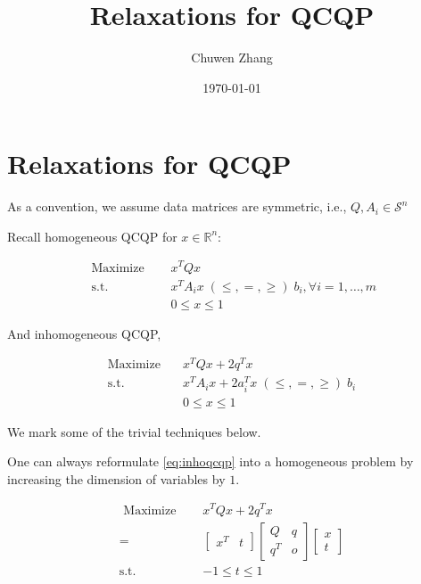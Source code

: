 \documentclass[../main]{subfiles}
\title{Relaxations for QCQP}
\author{Chuwen Zhang}
\date{\today}
\begin{document}
\maketitle
{
  \setcounter{tocdepth}{3}
  \tableofcontents
}

\section{Relaxations for QCQP}

As a convention, we assume data matrices are symmetric, i.e., \(Q, A_i \in \mathcal{S}^n\)

Recall homogeneous QCQP for \(x \in \mathbb R^n\):

\begin{equation}
  \begin{aligned}
    \textrm { Maximize } \quad & x^{T} Q x                                                      \\
    \text { s.t. }  \quad      & x^{T} A_{i} x\; (\le, =, \ge) \; b_{i}, \forall i=1, \ldots, m \\
                               & 0 \le x\le  1
  \end{aligned}
\end{equation}

And inhomogeneous QCQP,

\begin{equation}\label{eq:inhoqcqp}
  \begin{aligned}
    \mathrm{Maximize}\quad & x^TQx +2 q^T x                                   \\
    \mathrm{s.t.}  \quad   & x^{T} A_i x  + 2a_i^Tx   \; (\le, =, \ge) \; b_i \\
                           & 0 \le x\le  1
  \end{aligned}
\end{equation}

We mark some of the trivial techniques below.


One can always reformulate \eqref{eq:inhoqcqp} into a homogeneous problem by increasing the dimension of variables by $1$.

\begin{equation}
  \begin{aligned}
    \textrm { Maximize } \quad & x^{T} Q x  + 2q^Tx        \\
    =                          & \begin{bmatrix}x^T & t\end{bmatrix}
    \begin{bmatrix} Q   & q \\ q^T & o \end{bmatrix}
    \begin{bmatrix} x \\ t\end{bmatrix}                              \\
    \mathrm{s.t.} \quad        & - 1\le t \le 1
  \end{aligned}
\end{equation}
\end{document}
